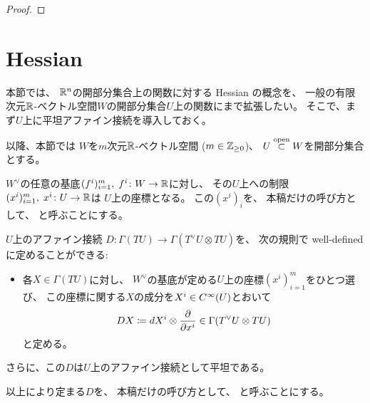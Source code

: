 \documentclass[report]{jlreq}
\begin{document}
\begin{proof}
    \TODO{}
\end{proof}

%
\section{Hessian}

本節では、
$\mathbb{R}^n$の開部分集合上の関数に対する Hessian の概念を、
一般の有限次元$\mathbb{R}$-ベクトル空間$W$の開部分集合$U$上の関数にまで拡張したい。
そこで、まず$U$上に平坦アファイン接続を導入しておく。

以降、本節では
$W$を$m$次元$\mathbb{R}$-ベクトル空間 ($m \in \mathbb{Z}_{\ge 0}$)、
$U \stackrel{\text{open}}{\subset} W$を開部分集合とする。

\begin{definition}
    $W^\vee$の任意の基底$(f^i)_{i = 1}^m, \; f^i \colon W \to \mathbb{R}$に対し、
    その$U$上への制限
    $(x^i)_{i = 1}^m, \; x^i \colon U \to \mathbb{R}$は
    $U$上の座標となる。
    この$(x^i)_i$を、
    本稿だけの呼び方として、
    と呼ぶことにする。
\end{definition}

\begin{propdef}
    $U$上のアファイン接続
    $D \colon \Gamma(TU) \to \Gamma(T^\vee U \otimes TU)$を、
    次の規則で well-defined に定めることができる:
    \begin{itemize}
        \item 各$X \in \Gamma(TU)$に対し、
            $W^\vee$の基底が定める$U$上の座標$(x^i)_{i = 1}^m$をひとつ選び、
            この座標に関する$X$の成分を$X^i \in C^\infty(U)$とおいて
            \begin{equation}
                \label{eq:def_connection_d}
                DX
                    \coloneqq dX^i \otimes \deldel{x^i}
                    \in \Gamma(T^\vee U \otimes TU)
            \end{equation}
            と定める。
    \end{itemize}
    さらに、この$D$は$U$上のアファイン接続として平坦である。

    以上により定まる$D$を、
    本稿だけの呼び方として、
    と呼ぶことにする。
\end{propdef}
\end{document}
